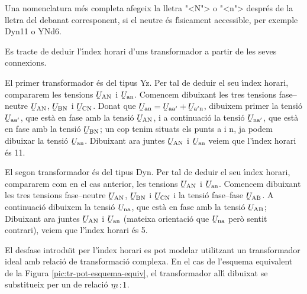 Una nomenclatura m\'{e}s completa afegeix la lletra {"<}N{">} o {"<}n{">} despr\'{e}s de la lletra del debanat corresponent, si el neutre \'{e}s f\'{\i}sicament accessible, per exemple Dyn11 o YNd6.

\begin{exemple}
    Es tracte de deduir l'\'{\i}ndex horari d'uns transformador a partir de les seves connexions.

    El primer transformador \'{e}s del tipus Yz. Per tal de deduir el seu \'{\i}ndex horari, compararem les tensions
    $\cmplx{U}\ped{AN}$ i $\cmplx{U}\ped{an}$. Comencem dibuixant les tres tensions fase--neutre $\cmplx{U}\ped{AN}$, $\cmplx{U}\ped{BN}$ i $\cmplx{U}\ped{CN}$. Donat que $\cmplx{U}\ped{an} = \cmplx{U}\ped{aa'} + \cmplx{U}\ped{a'n}$, dibuixem primer la tensi\'{o} $\cmplx{U}\ped{aa'}$, que est\`{a} en fase amb la tensi\'{o} $\cmplx{U}\ped{AN}$, i a continuaci\'{o} la tensi\'{o} $\cmplx{U}\ped{na'}$, que est\`{a} en fase amb la tensi\'{o} $\cmplx{U}\ped{BN}$; un cop tenim situats els punts a i n, ja podem dibuixar la tensi\'{o} $\cmplx{U}\ped{an}$. Dibuixant ara juntes $\cmplx{U}\ped{AN}$ i $\cmplx{U}\ped{an}$  veiem que l'\'{\i}ndex horari \'{e}s 11.

    \begin{center}
        
    \end{center}

     El segon transformador \'{e}s del tipus Dyn. Per tal de deduir el seu \'{\i}ndex horari, compararem com en el cas anterior, les tensions $\cmplx{U}\ped{AN}$ i $\cmplx{U}\ped{an}$. Comencem dibuixant les tres tensions fase--neutre $\cmplx{U}\ped{AN}$, $\cmplx{U}\ped{BN}$ i $\cmplx{U}\ped{CN}$ i la tensi\'{o} fase--fase $\cmplx{U}\ped{AB}$.  A continuaci\'{o} dibuixem la tensi\'{o} $\cmplx{U}\ped{na}$, que est\`{a} en fase amb la tensi\'{o} $\cmplx{U}\ped{AB}$; Dibuixant ara juntes $\cmplx{U}\ped{AN}$ i $\cmplx{U}\ped{an}$ (mateixa orientaci\'{o} que $\cmplx{U}\ped{na}$ per\`{o} sentit contrari),  veiem que l'\'{\i}ndex horari \'{e}s 5.

    \begin{center}
       
    \end{center}
\end{exemple}

El desfase introdu\"{\i}t per l'\'{\i}ndex horari es pot modelar utilitzant  un transformador ideal amb relaci\'{o} de transformaci\'{o} complexa. En el cas de l'esquema equivalent de la Figura  \vref{pic:tr-pot-esquema-equiv}, el transformador all\'{\i} dibuixat
se substitueix per un de relaci\'{o} $\cmplx{m}\!:\!1$.


